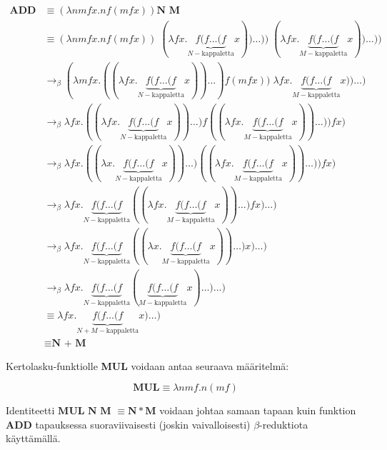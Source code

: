 \begin{esim}
\begin{align*} \textbf{ADD N M} &\equiv (\lambda nmfx . n f (m f x)) \textbf{N M} \\ 
&\equiv  (\lambda nmfx . n f (m f x)) \; (\lambda fx . \underbrace{ f ( f \ldots (f }_{ N-\text{kappaletta}} x)) \ldots )) \; (\lambda fx . \underbrace{ f ( f \ldots (f }_{ M-\text{kappaletta}} x)) \ldots ))\\ 
&\rightarrow_{\beta} (\lambda mfx . ((\lambda fx . \underbrace{ f ( f \ldots (f }_{ N-\text{kappaletta}} x)) \ldots ) f (m f x)) \; \lambda fx . \underbrace{ f ( f \ldots (f }_{ M-\text{kappaletta}} x)) \ldots )\\ 
&\rightarrow_{\beta} \lambda fx . ((\lambda fx . \underbrace{ f ( f \ldots (f }_{ N-\text{kappaletta}} x)) \ldots ) f ( (\lambda fx . \underbrace{ f ( f \ldots (f }_{ M-\text{kappaletta}} x)) \ldots )) f x ) \\
&\rightarrow_{\beta} \lambda fx . ((\lambda x . \underbrace{ f ( f \ldots (f }_{ N-\text{kappaletta}} x)) \ldots ) ( (\lambda fx . \underbrace{ f ( f \ldots (f }_{ M-\text{kappaletta}} x)) \ldots )) f x ) \\
&\rightarrow_{\beta}  \lambda fx . \underbrace{ f ( f \ldots (f }_{ N-\text{kappaletta}} ( (\lambda fx . \underbrace{ f ( f \ldots (f }_{ M-\text{kappaletta}} x)) \ldots ) f x ) \ldots )\\
&\rightarrow_{\beta}  \lambda fx . \underbrace{ f ( f \ldots (f }_{ N-\text{kappaletta}} ( (\lambda x . \underbrace{ f ( f \ldots (f }_{ M-\text{kappaletta}} x)) \ldots )  x ) \ldots) \\
&\rightarrow_{\beta}  \lambda fx . \underbrace{ f ( f \ldots (f }_{ N-\text{kappaletta}} (\underbrace{ f ( f \ldots (f }_{ M-\text{kappaletta}} x) \ldots ) \ldots ) \\
&\equiv \lambda fx . \underbrace{ f ( f \ldots (f }_{ N + M-\text{kappaletta}} x) \ldots ) \\
&\equiv \textbf{N + M}  
\end{align*}

Kertolasku-funktiolle \textbf{MUL} voidaan antaa seuraava määritelmä:

\[ \textbf{MUL} \equiv \lambda n m f . n (mf) \]

Identiteetti $\textbf{MUL N M } \equiv \textbf{N} * \textbf{M}$ voidaan johtaa samaan tapaan kuin funktion \textbf{ADD} tapauksessa suoraviivaisesti (joskin vaivalloisesti) $\beta$-reduktiota käyttämällä. 

\par


\end{esim}
